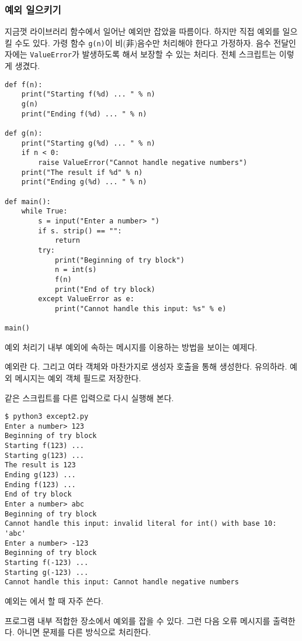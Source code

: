 \documentclass[a4paper]{oblivoir}
\begin{document}
\subsubsection*{예외 일으키기}

지금껏 라이브러리 함수에서 일어난 예외만 잡았을 따름이다. 하지만 직접 예외를 일으킬 수도 있다. 가령 함수 \texttt{g(n)}이 비(非)음수만 처리해야 한다고 가정하자. 음수 전달인자에는 \texttt{ValueError}가 발생하도록 해서 보장할 수 있는 처리다. 전체 스크립트는 이렇게 생겼다. 

\begin{verbatim}
def f(n):
    print("Starting f(%d) ... " % n)
    g(n)
    print("Ending f(%d) ... " % n)
    
def g(n):
    print("Starting g(%d) ... " % n)
    if n < 0:
        raise ValueError("Cannot handle negative numbers")
    print("The result if %d" % n)
    print("Ending g(%d) ... " % n)

def main():
    while True:
        s = input("Enter a number> ")
        if s. strip() == "":
            return
        try:
            print("Beginning of try block")
            n = int(s)
            f(n)
            print("End of try block)
        except ValueError as e:
            print("Cannot handle this input: %s" % e)

main()
\end{verbatim}

예외 처리기 내부 예외에 속하는 메시지를 이용하는 방법을 보이는 예제다.

예외란 다. 그리고 여타 객체와 마찬가지로 생성자 호출을 통해 생성한다. 유의하라. 예외 메시지는 예외 객체 필드로 저장한다.

같은 스크립트를 다른 입력으로 다시 실행해 본다.

\begin{lstlisting}
$ python3 except2.py
Enter a number> 123
Beginning of try block
Starting f(123) ...
Starting g(123) ...
The result is 123
Ending g(123) ...
Ending f(123) ...
End of try block
Enter a number> abc
Beginning of try block
Cannot handle this input: invalid literal for int() with base 10: 'abc'
Enter a number> -123
Beginning of try block
Starting f(-123) ...
Starting g(-123) ...
Cannot handle this input: Cannot handle negative numbers
\end{lstlisting}

예외는 에서 할 때 자주 쓴다.

프로그램 내부 적합한 장소에서 예외를 잡을 수 있다. 그런 다음 오류 메시지를 출력한다. 아니면 문제를 다른 방식으로 처리한다.
\end{document}
